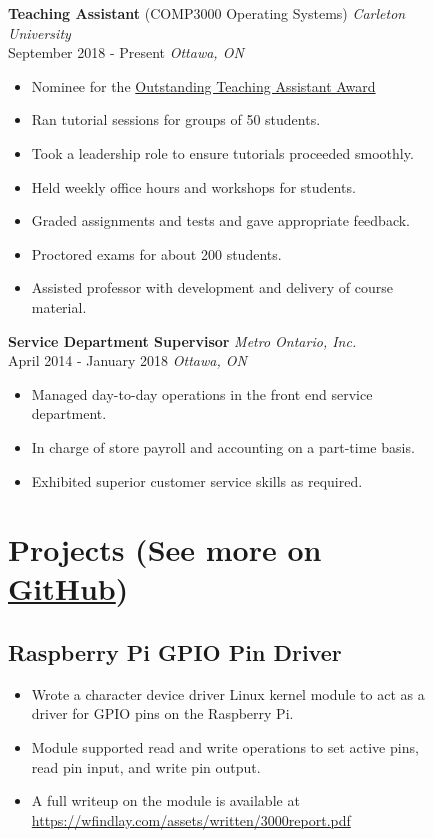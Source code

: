 \documentclass[]{article}
\theoremstyle{plain}
\theoremstyle{remark}
\theoremstyle{definition}
\begin{document}
\begin{figure}
\begin{minipage}[t]{0.65\textwidth}
\color{black}
\textbf{Teaching Assistant} (COMP3000 Operating Systems) \hfill \emph{Carleton University}\\
September 2018 - Present \hfill\emph {Ottawa, ON}
\color{gray}
\begin{itemize}[itemsep=0em]
\item Nominee for the \href{https://carleton.ca/tasupport/taawards/edc-outstanding-ta-awards/}{Outstanding Teaching Assistant Award}
\item Ran tutorial sessions for groups of 50 students.
\item Took a leadership role to ensure tutorials proceeded smoothly.
\item Held weekly office hours and workshops for students.
\item Graded assignments and tests and gave appropriate feedback.
\item Proctored exams for about 200 students.
\item Assisted professor with development and delivery of course material.
\end{itemize}

\color{black}
\textbf{Service Department Supervisor} \hfill \emph{Metro Ontario, Inc.}\\
April 2014 - January 2018 \hfill\emph {Ottawa, ON}
\color{gray}
\begin{itemize}[itemsep=0em]
\item Managed day-to-day operations in the front end service department.
\item In charge of store payroll and accounting on a part-time basis.
\item Exhibited superior customer service skills as required.
\end{itemize}

\section{Projects \normalfont \small (See more on \href{https://www.github.com/willfindlay}{GitHub})}

\subsection{Raspberry Pi GPIO Pin Driver}
\begin{itemize}[itemsep=0em]
\item Wrote a character device driver Linux kernel module to act as a driver for GPIO pins on the Raspberry Pi.
\item Module supported read and write operations to set active pins, read pin input, and write pin output.
\item A full writeup on the module is available at \url{https://wfindlay.com/assets/written/3000report.pdf}
\end{itemize}


\end{minipage}
\end{figure}
\end{document}
